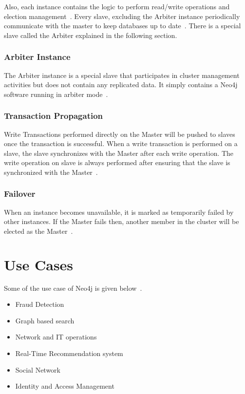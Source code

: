 \documentclass[9pt,twocolumn,twoside]{styles/osajnl}
\begin{document}
Also, each instance contains the logic to perform read/write operations and election management~\cite{www-neo4j-ha}. Every slave, excluding the Arbiter instance periodically communicate with the master to keep databases up to date~\cite{www-neo4j-ha}. There is a special slave called the Arbiter explained in the following section.
\subsubsection{Arbiter Instance}
The Arbiter instance is a special slave  that participates in cluster management activities but does not contain any replicated data. It simply contains a Neo4j software running in arbiter mode~\cite{www-neo4j-ha}. 
\subsubsection{Transaction Propagation}
Write Transactions performed directly on the Master will be pushed to slaves once the transaction is successful. When a write transaction is performed on a slave, the slave synchronizes with the Master after each write operation. The write operation on slave is always performed after ensuring that the slave is synchronized with the Master~\cite{www-neo4j-ha}. 

\subsubsection{Failover}
When an instance becomes unavailable, it is marked as temporarily failed by other instances. If the Master fails then, another member in the cluster will be elected as the Master~\cite{www-neo4j-ha}. 

\section{Use Cases}
Some of the use case of Neo4j is given below~\cite{www-neo4j-uc}.
\begin{itemize}
    \item Fraud Detection
    \item Graph based search
    \item Network and IT operations
    \item Real-Time Recommendation system
    \item Social Network
    \item Identity and Access Management
\end{itemize}
\end{document}
